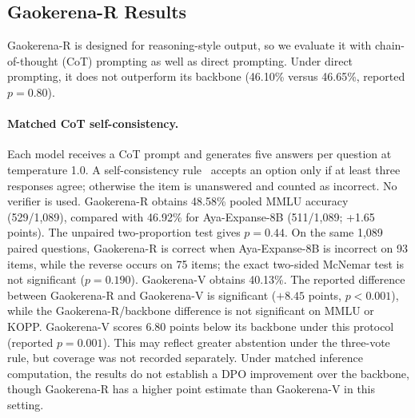 \documentclass[manuscript,screen,review]{acmart}
\begin{document}
\subsection{Gaokerena-R Results}\label{subsec6.2}

Gaokerena-R is designed for reasoning-style output, so we evaluate it with chain-of-thought (CoT) prompting as well as direct prompting. Under direct prompting, it does not outperform its backbone (46.10\% versus 46.65\%, reported $p=0.80$).

\paragraph{Matched CoT self-consistency.} Each model receives a CoT prompt and generates five answers per question at temperature 1.0. A self-consistency rule~\cite{b36} accepts an option only if at least three responses agree; otherwise the item is unanswered and counted as incorrect. No verifier is used. Gaokerena-R obtains 48.58\% pooled MMLU accuracy (529/1,089), compared with 46.92\% for Aya-Expanse-8B (511/1,089; +1.65 points). The unpaired two-proportion test gives $p=0.44$. On the same 1,089 paired questions, Gaokerena-R is correct when Aya-Expanse-8B is incorrect on 93 items, while the reverse occurs on 75 items; the exact two-sided McNemar test is not significant ($p=0.190$). Gaokerena-V obtains 40.13\%. The reported difference between Gaokerena-R and Gaokerena-V is significant ($+8.45$ points, $p<0.001$), while the Gaokerena-R/backbone difference is not significant on MMLU or KOPP. Gaokerena-V scores 6.80 points below its backbone under this protocol (reported $p=0.001$). This may reflect greater abstention under the three-vote rule, but coverage was not recorded separately. Under matched inference computation, the results do not establish a DPO improvement over the backbone, though Gaokerena-R has a higher point estimate than Gaokerena-V in this setting.
\end{document}
